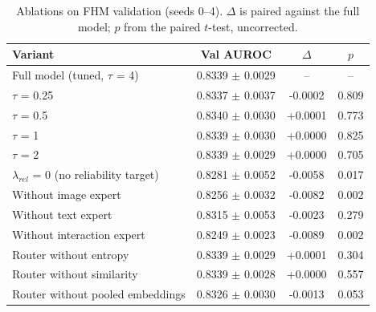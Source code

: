 \begin{table}[t]
\centering
\caption{Ablations on FHM validation (seeds 0--4). $\Delta$ is paired against the full model; $p$ from the paired $t$-test, uncorrected.}
\label{tab:ablations}
\begin{tabular}{lccc}
\toprule
Variant & Val AUROC & $\Delta$ & $p$ \\
\midrule
Full model (tuned, $\tau$ = 4) & 0.8339 $\pm$ 0.0029 & – & – \\
$\tau$ = 0.25 & 0.8337 $\pm$ 0.0037 & -0.0002 & 0.809 \\
$\tau$ = 0.5 & 0.8340 $\pm$ 0.0030 & +0.0001 & 0.773 \\
$\tau$ = 1 & 0.8339 $\pm$ 0.0030 & +0.0000 & 0.825 \\
$\tau$ = 2 & 0.8339 $\pm$ 0.0029 & +0.0000 & 0.705 \\
$\lambda_{rel}$ = 0 (no reliability target) & 0.8281 $\pm$ 0.0052 & -0.0058 & 0.017 \\
Without image expert & 0.8256 $\pm$ 0.0032 & -0.0082 & 0.002 \\
Without text expert & 0.8315 $\pm$ 0.0053 & -0.0023 & 0.279 \\
Without interaction expert & 0.8249 $\pm$ 0.0023 & -0.0089 & 0.002 \\
Router without entropy & 0.8339 $\pm$ 0.0029 & +0.0001 & 0.304 \\
Router without similarity & 0.8339 $\pm$ 0.0028 & +0.0000 & 0.557 \\
Router without pooled embeddings & 0.8326 $\pm$ 0.0030 & -0.0013 & 0.053 \\
\bottomrule
\end{tabular}
\end{table}
